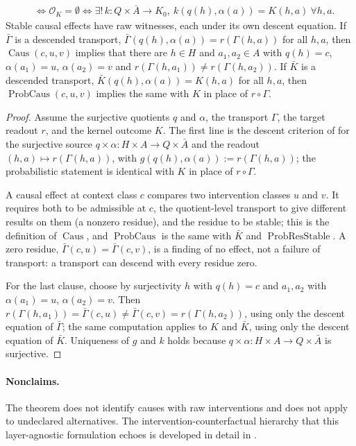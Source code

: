 \begin{theorem}
\begin{align*}
  &\iff \mathcal O_{K}=\emptyset
  \iff
  \exists!\,k:Q\times\bar A\to K_0,\
    k(q(h),\alpha(a))=K(h,a)\ \forall h,a.
\end{align*}
Stable causal effects have raw witnesses, each under its own descent
equation. If \(\bar\Gamma\) is a descended transport,
\(\bar\Gamma(q(h),\alpha(a))=r(\Gamma(h,a))\) for all \(h,a\), then
\(\operatorname{Caus}(c,u,v)\) implies that there are \(h\in H\) and
\(a_1,a_2\in A\) with \(q(h)=c\), \(\alpha(a_1)=u\), \(\alpha(a_2)=v\) and
\(r(\Gamma(h,a_1))\ne r(\Gamma(h,a_2))\). If \(\bar K\) is a descended
transport, \(\bar K(q(h),\alpha(a))=K(h,a)\) for all \(h,a\), then
\(\operatorname{ProbCaus}(c,u,v)\) implies the same with \(K\) in place of
\(r\circ\Gamma\).
\end{theorem}
\begin{proof}
Assume the surjective quotients \(q\) and \(\alpha\), the transport
\(\Gamma\), the target readout \(r\), and the kernel outcome \(K\).
The first line is the descent criterion of \Cref{sec:apparatus} for
the surjective source \(q\times\alpha:H\times A\to Q\times\bar A\) and the
readout \((h,a)\mapsto r(\Gamma(h,a))\), with
\(g(q(h),\alpha(a)):=r(\Gamma(h,a))\); the probabilistic statement is
identical with \(K\) in place of \(r\circ\Gamma\).

A causal effect at context class \(c\) compares two intervention
classes \(u\) and \(v\).  It requires both to be admissible at \(c\),
the quotient-level transport to give different results on them (a
nonzero residue), and the residue to be stable; this is the definition of
\(\operatorname{Caus}\), and \(\operatorname{ProbCaus}\) is the same with
\(\bar K\) and \(\operatorname{ProbResStable}\).  A zero residue,
\(\bar\Gamma(c,u)=\bar\Gamma(c,v)\), is a finding of no effect, not a
failure of transport: a transport can descend with every residue zero.

For the last clause, choose by surjectivity \(h\) with \(q(h)=c\) and
\(a_1,a_2\) with \(\alpha(a_1)=u\), \(\alpha(a_2)=v\). Then
\(r(\Gamma(h,a_1))=\bar\Gamma(c,u)\ne\bar\Gamma(c,v)=r(\Gamma(h,a_2))\), using
only the descent equation of \(\bar\Gamma\); the same computation applies to
\(K\) and \(\bar K\), using only the descent equation of \(\bar K\).
Uniqueness of \(g\) and \(k\) holds because \(q\times\alpha:H\times A\to Q\times\bar A\) is surjective.
\end{proof}

\paragraph{Nonclaims.} The theorem does not identify causes with raw interventions and does
not apply to undeclared alternatives.  The intervention-counterfactual
hierarchy that this layer-agnostic formulation echoes is developed
in detail in \citet{Pearl2009Causality}.

